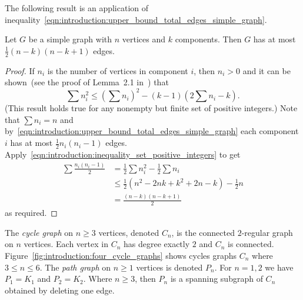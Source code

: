 The following result is an application of
inequality~\eqref{eqn:introduction:upper_bound_total_edges_simple_graph}.

\begin{theorem}
Let $G$ be a simple graph with $n$ vertices and $k$ components. Then
$G$ has at most $\frac{1}{2} (n - k)(n - k + 1)$ edges.
\end{theorem}

\begin{proof}
If $n_i$ is the number of vertices in component $i$, then $n_i > 0$
and it can be shown~(see the proof of Lemma~2.1
in~\cite[pp.21--22]{Foulds1992}) that
\begin{equation}
\label{eqn:introduction:inequality_set_positive_integers}
\sum n_i^2
\leq
\left(\sum n_i\right)^2 - (k - 1) \left(2 \sum n_i - k\right).
\end{equation}
(This result holds true for any nonempty but finite set of positive
integers.) Note that $\sum n_i = n$ and
by~\eqref{eqn:introduction:upper_bound_total_edges_simple_graph} each
component $i$ has at most $\frac{1}{2} n_i (n_i - 1)$
edges. Apply~\eqref{eqn:introduction:inequality_set_positive_integers}
to get
\begin{align*}
\sum \frac{n_i (n_i - 1)}{2}
&=
\frac{1}{2} \sum n_i^2 - \frac{1}{2} \sum n_i \\[4pt]
&\leq
\frac{1}{2} (n^2 - 2nk + k^2 + 2n - k) - \frac{1}{2} n \\[4pt]
&=
\frac{(n - k) (n - k + 1)}{2}
\end{align*}
as required.
\end{proof}

The \emph{cycle graph} on $n \geq 3$ vertices,
denoted $C_n$, is the connected $2$-regular graph on $n$
vertices. Each vertex in $C_n$ has degree exactly $2$ and $C_n$ is
connected. Figure~\ref{fig:introduction:four_cycle_graphs} shows
cycles graphs $C_n$ where $3 \leq n \leq 6$. The
\emph{path graph} on $n \geq 1$ vertices is denoted
$P_n$. For $n = 1, 2$ we have $P_1 = K_1$ and
$P_2 = K_2$. Where $n \geq 3$, then $P_n$ is a spanning subgraph of
$C_n$ obtained by deleting one edge.

